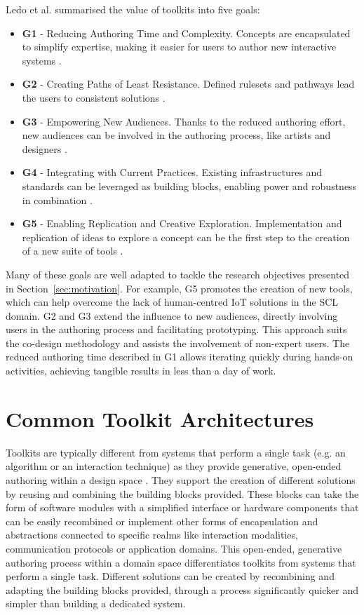 Ledo et al. \autocite*{ledo_evaluation_2018} summarised the value of toolkits into five goals:
\begin{itemize}
    \item \textbf{G1} - Reducing Authoring Time and Complexity. Concepts are encapsulated to simplify expertise, making it easier for users to author new interactive systems \autocites{greenberg_toolkits_2007, olsen_jr_evaluating_2007}.
    \item \textbf{G2} - Creating Paths of Least Resistance. Defined rulesets and pathways lead the users to consistent solutions \autocite{myers_past_2000}.
    \item \textbf{G3} - Empowering New Audiences. Thanks to the reduced authoring effort, new audiences can be involved in the authoring process, like artists and designers \autocite{olsen_jr_evaluating_2007}.
    \item \textbf{G4} - Integrating with Current Practices. Existing infrastructures and standards can be leveraged as building blocks, enabling power and robustness in combination \autocite{olsen_jr_evaluating_2007}.
    \item \textbf{G5} - Enabling Replication and Creative Exploration. Implementation and replication of ideas to explore a concept can be the first step to the creation of a new suite of tools \autocite{greenberg_toolkits_2007}.
\end{itemize}

Many of these goals are well adapted to tackle the research objectives presented in Section~\ref{sec:motivation}. For example, G5 promotes the creation of new tools, which can help overcome the lack of human-centred IoT solutions in the SCL domain. G2 and G3 extend the influence to new audiences, directly involving users in the authoring process and facilitating prototyping. This approach suits the co-design methodology and assists the involvement of non-expert users. The reduced authoring time described in G1 allows iterating quickly during hands-on activities, achieving tangible results in less than a day of work.


\section{Common Toolkit Architectures}

Toolkits are typically different from systems that perform a single task (e.g. an algorithm or an interaction technique) as they provide generative, open-ended authoring within a design space \autocite{ledo_evaluation_2018}. They support the creation of different solutions by reusing and combining the building blocks provided. These blocks can take the form of software modules with a simplified interface or hardware components that can be easily recombined or implement other forms of encapsulation and abstractions connected to specific realms like interaction modalities, communication protocols or application domains.
This open-ended, generative authoring process within a domain space differentiates toolkits from systems that perform a single task. Different solutions can be created by recombining and adapting the building blocks provided, through a process significantly quicker and simpler than building a dedicated system.


